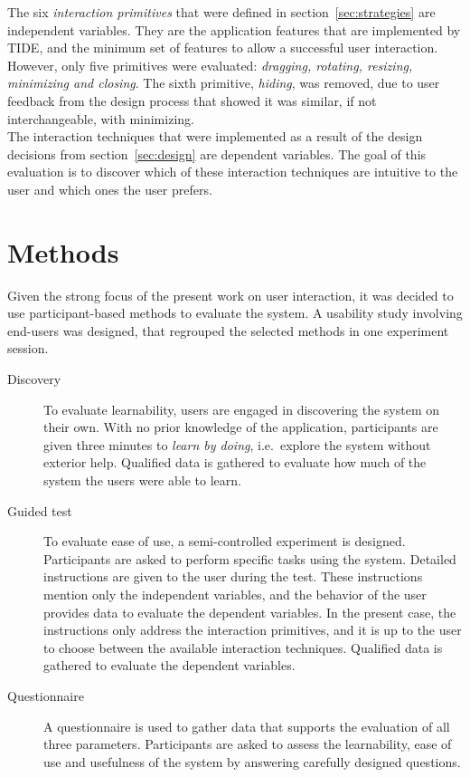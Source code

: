 The six \emph{interaction primitives} that were defined in section~\ref{sec:strategies} are independent variables.
They are the application features that are implemented by TIDE, and the minimum set of features to allow a successful user interaction.
However, only five primitives were evaluated: \emph{dragging, rotating, resizing, minimizing and closing}.
The sixth primitive, \emph{hiding}, was removed, due to user feedback from the design process that showed it was similar, if not interchangeable, with minimizing.
\\
\linebreak
The interaction techniques that were implemented as a result of the design decisions from section~\ref{sec:design} are dependent variables.
The goal of this evaluation is to discover which of these interaction techniques are intuitive to the user and which ones the user prefers. 


\section{Methods}
\label{sec:methods}

Given the strong focus of the present work on user interaction, it was decided to use participant-based methods to evaluate the system.
A usability study involving end-users was designed, that regrouped the selected methods in one experiment session.

\begin{description}

\item[Discovery]

To evaluate learnability, users are engaged in discovering the system on their own.
With no prior knowledge of the application, participants are given three minutes to \emph{learn by doing}, i.e.\ explore the system without exterior help.
Qualified data is gathered to evaluate how much of the system the users were able to learn.

\item[Guided test]

To evaluate ease of use, a semi-controlled experiment is designed.
Participants are asked to perform specific tasks using the system.
Detailed instructions are given to the user during the test.
These instructions mention only the independent variables, and the behavior of the user provides data to evaluate the dependent variables.
In the present case, the instructions only address the interaction primitives, and it is up to the user to choose between the available interaction techniques.
Qualified data is gathered to evaluate the dependent variables.

\item[Questionnaire]

A questionnaire is used to gather data that supports the evaluation of all three parameters.
Participants are asked to assess the learnability, ease of use and usefulness of the system by answering carefully designed questions.

\end{description}


